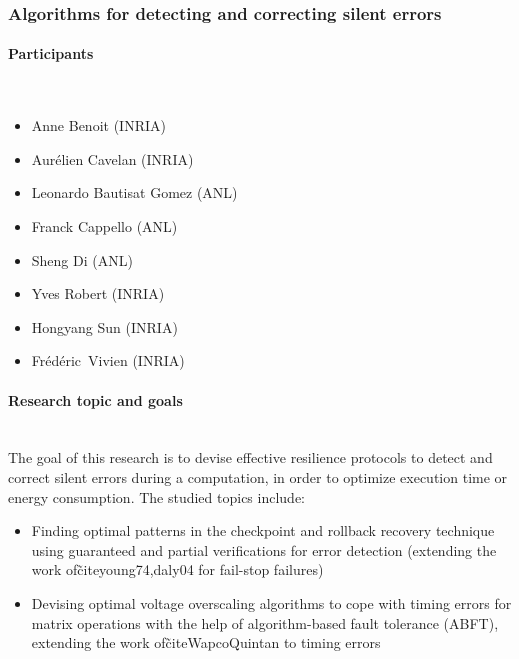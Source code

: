 
\subsubsection{Algorithms for detecting and correcting silent errors}
\label{sec.report.silent} %

\begin{refsection}
\nocite{*}

\paragraph{Participants}~\\

\begin{itemize}
	\item Anne Benoit (INRIA)
	\item Aur\'{e}lien Cavelan (INRIA)
	\item Leonardo Bautisat Gomez (ANL)
	\item Franck Cappello (ANL)
	\item Sheng Di (ANL)
	\item Yves Robert (INRIA)
	\item Hongyang Sun (INRIA)
	\item Fr\'{e}d\'{e}ric~Vivien (INRIA)
\end{itemize}	

\paragraph{Research topic and goals}~\\

The goal of this research is to devise effective resilience protocols to detect and correct silent errors during a computation, in order to optimize execution time or energy consumption. The studied topics include:

\begin{itemize}
\item Finding optimal patterns in the checkpoint and rollback recovery technique using guaranteed and partial verifications for error detection (extending the work of\~cite{young74,daly04} for fail-stop failures)
\item Devising optimal voltage overscaling algorithms to cope with timing errors for matrix operations with the help of algorithm-based fault tolerance (ABFT), extending the work of\~cite{WapcoQuintan}
to timing errors
\end{itemize}


\end{refsection}
